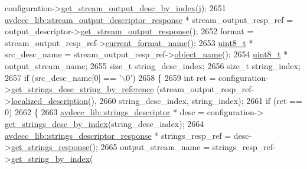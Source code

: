 \begin{DoxyCode}
      configuration->\hyperlink{classavdecc__lib_1_1configuration__descriptor_a300ea5957342e2e9579318135da02856}{get\_stream\_output\_desc\_by\_index}(j);
2651             \hyperlink{classavdecc__lib_1_1stream__output__descriptor__response}{avdecc\_lib::stream\_output\_descriptor\_response} * 
      stream\_output\_resp\_ref = output\_descriptor->\hyperlink{classavdecc__lib_1_1stream__output__descriptor_af92b70610c451a7f1eefcb71b3d97eb8}{get\_stream\_output\_response}();
2652             format = stream\_output\_resp\_ref->\hyperlink{classavdecc__lib_1_1stream__output__descriptor__response_a24176b56bc0f1873b27d00565bc397c5}{current\_format\_name}();
2653             \hyperlink{stdint_8h_aba7bc1797add20fe3efdf37ced1182c5}{uint8\_t} * src\_desc\_name = stream\_output\_resp\_ref->\hyperlink{classavdecc__lib_1_1descriptor__response__base_a133f7774946d80f82b8aaaa4cfbb7361}{object\_name}();
2654             \hyperlink{stdint_8h_aba7bc1797add20fe3efdf37ced1182c5}{uint8\_t} * output\_stream\_name;
2655             \textcolor{keywordtype}{size\_t} string\_desc\_index;
2656             \textcolor{keywordtype}{size\_t} string\_index;
2657             \textcolor{keywordflow}{if} (src\_desc\_name[0] == \textcolor{charliteral}{'\(\backslash\)0'})
2658             \{
2659                 \textcolor{keywordtype}{int} ret = configuration->\hyperlink{classavdecc__lib_1_1configuration__descriptor_a3f384e636a80f7a66b477b1d7963b347}{get\_strings\_desc\_string\_by\_reference}
      (stream\_output\_resp\_ref->\hyperlink{classavdecc__lib_1_1stream__output__descriptor__response_a1fb9de45567df344090a1407aa6b775f}{localized\_description}(),
2660                                                                               string\_desc\_index, 
      string\_index);
2661                 \textcolor{keywordflow}{if} (ret == 0)
2662                 \{
2663                     \hyperlink{classavdecc__lib_1_1strings__descriptor}{avdecc\_lib::strings\_descriptor} * desc = configuration->
      \hyperlink{classavdecc__lib_1_1configuration__descriptor_a34531c290e12e85895a804c067e9919e}{get\_strings\_desc\_by\_index}(string\_desc\_index);
2664                     \hyperlink{classavdecc__lib_1_1strings__descriptor__response}{avdecc\_lib::strings\_descriptor\_response} * 
      strings\_resp\_ref = desc->\hyperlink{classavdecc__lib_1_1strings__descriptor_a313776812dd7fa955eb6e60c9c92956a}{get\_strings\_response}();
2665                     output\_stream\_name = strings\_resp\_ref->\hyperlink{classavdecc__lib_1_1strings__descriptor__response_ae8f3e50f4e5051488a864fd8acc6da31}{get\_string\_by\_index}(

\end{DoxyCode}

